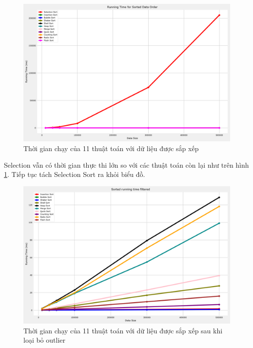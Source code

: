 \begin{figure}[H]
    \centering
    \includegraphics[width=\textwidth]{experimental_result/images/sorted_running_time.png}
    \caption{Thời gian chạy của 11 thuật toán với dữ liệu được sắp xếp}
    \label{fig:sorted_running_time}
\end{figure}

Selection vẫn có thời gian thực thi lớn so với các thuật toán còn lại như trên hình \ref{fig:sorted_running_time}. Tiếp tục tách Selection Sort ra khỏi biểu đồ.

\begin{figure}[H]
    \centering
    \includegraphics[width=\textwidth]{experimental_result/images/sorted_running_time_filtered.png}
    \caption{Thời gian chạy của 11 thuật toán với dữ liệu được sắp xếp sau khi loại bỏ outlier}
    \label{fig:sorted_running_time_filtered}
\end{figure}


